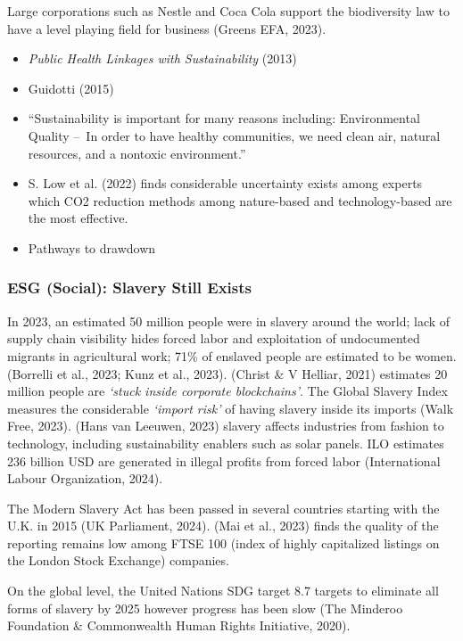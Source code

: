 \documentclass[
  letterpaper,
  DIV=11,
  numbers=noendperiod]{scrartcl}
\begin{document}
Large corporations such as Nestle and Coca Cola support the biodiversity
law to have a level playing field for business (Greens EFA, 2023).

\begin{itemize}
\item
  \emph{Public {Health Linkages} with {Sustainability}} (2013)
\item
  Guidotti (2015)
\item
  ``Sustainability is important for many reasons including:
  Environmental Quality --~In order to have healthy communities, we need
  clean air, natural resources, and a nontoxic environment.''
\item
  S. Low et al. (2022) finds considerable uncertainty exists among
  experts which CO2 reduction methods among nature-based and
  technology-based are the most effective.
\item
  Pathways to drawdown
\end{itemize}

\subsubsection{ESG (Social): Slavery Still
Exists}\label{esg-social-slavery-still-exists}

In 2023, an estimated 50 million people were in slavery around the
world; lack of supply chain visibility hides forced labor and
exploitation of undocumented migrants in agricultural work; 71\% of
enslaved people are estimated to be women. (Borrelli et al., 2023; Kunz
et al., 2023). (Christ \& V Helliar, 2021) estimates 20 million people
are \emph{`stuck inside corporate blockchains'}. The Global Slavery
Index measures the considerable \emph{`import risk'} of having slavery
inside its imports (Walk Free, 2023). (Hans van Leeuwen, 2023) slavery
affects industries from fashion to technology, including sustainability
enablers such as solar panels. ILO estimates 236 billion USD are
generated in illegal profits from forced labor (International Labour
Organization, 2024).

The Modern Slavery Act has been passed in several countries starting
with the U.K. in 2015 (UK Parliament, 2024). (Mai et al., 2023) finds
the quality of the reporting remains low among FTSE 100 (index of highly
capitalized listings on the London Stock Exchange) companies.

On the global level, the United Nations SDG target 8.7 targets to
eliminate all forms of slavery by 2025 however progress has been slow
(The Minderoo Foundation \& Commonwealth Human Rights Initiative, 2020).
\end{document}
